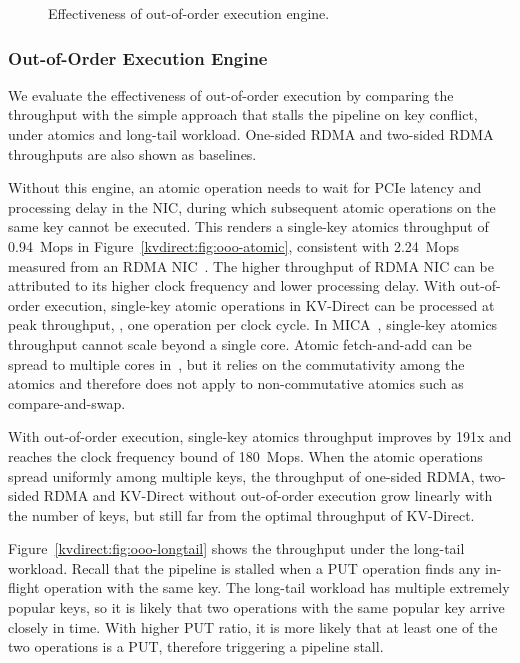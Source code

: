 \begin{figure}[t]
\centering
{}
\caption{Effectiveness of out-of-order execution engine.}
\label{kvdirect:fig:ooo-eval}

\end{figure}


\subsubsection{Out-of-Order Execution Engine}
\label{kvdirect:sec:ooo-eval}

We evaluate the effectiveness of out-of-order execution by comparing the throughput with the simple approach that stalls the pipeline on key conflict, under atomics and long-tail workload. One-sided RDMA and two-sided RDMA~\cite{kalia2016design} throughputs are also shown as baselines.

Without this engine, an atomic operation needs to wait for PCIe latency and processing delay in the NIC, during which subsequent atomic operations on the same key cannot be executed.
This renders a single-key atomics throughput of 0.94~Mops in Figure~\ref{kvdirect:fig:ooo-atomic}, consistent with 2.24~Mops measured from an RDMA NIC~\cite{kalia2016design}.
The higher throughput of RDMA NIC can be attributed to its higher clock frequency and lower processing delay.
With out-of-order execution, single-key atomic operations in KV-Direct can be processed at peak throughput, \ie, one operation per clock cycle.
In MICA~\cite{lim2014mica}, single-key atomics throughput cannot scale beyond a single core.
Atomic fetch-and-add can be spread to multiple cores in~\cite{kalia2016design}, but it relies on the commutativity among the atomics and therefore does not apply to non-commutative atomics such as compare-and-swap.

With out-of-order execution, single-key atomics throughput improves by 191x and reaches the clock frequency bound of 180~Mops.
When the atomic operations spread uniformly among multiple keys, the throughput of one-sided RDMA, two-sided RDMA and KV-Direct without out-of-order execution grow linearly with the number of keys, but still far from the optimal throughput of KV-Direct.

Figure~\ref{kvdirect:fig:ooo-longtail} shows the throughput under the long-tail workload.
Recall that the pipeline is stalled when a PUT operation finds any in-flight operation with the same key.
The long-tail workload has multiple extremely popular keys, so it is likely that two operations with the same popular key arrive closely in time.
With higher PUT ratio, it is more likely that at least one of the two operations is a PUT, therefore triggering a pipeline stall.


